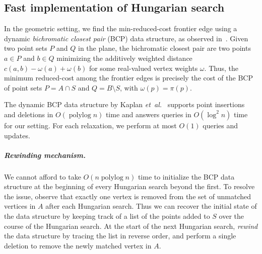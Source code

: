 \documentclass[a4paper,UKenglish]{socg-lipics-v2018}
\makeatletter
\def\etal{\emph{et~al.}}
\def\etal{\textit{et~al.}}
\def\polylog{\mathop{\mathrm{polylog}}}
\theoremstyle{plain}
\numberwithin{figure}{section}
\renewcommand{\paragraph}{\subparagraph}
\def\EMPH#1{\textcolor{BrickRed}{{\emph{#1}}}}
\def\n@te#1{\textsf{\boldmath \textbf{$\langle\!\langle$#1$\rangle\!\rangle$}}\leavevmode}
\def\note#1{\textcolor{red}{\n@te{#1}}}
\renewcommand{\note}[1]{} %
\makeatother
\begin{document}

\subsection{Fast implementation of Hungarian search}
\label{SS:fast-hungarian-matching}


In the geometric setting, we find the min-reduced-cost frontier edge using a dynamic
\EMPH{bichromatic closest pair} (BCP) data structure, as observed
in~\cite{AFPVX17,Vaidya89}.
Given two point sets $P$ and $Q$ in the plane, the bichromatic closest pair are two points
$a \in P$ and $b \in Q$ minimizing the additively weighted distance
$c(a, b) - \omega(a) + \omega(b)$ for some real-valued vertex weights $\omega$.
Thus, the minimum reduced-cost among the frontier edges is precisely the cost of the BCP of point sets
$P = A \cap S$ and $Q = B \setminus S$, with $\omega(p) = \pi(p)$.

The dynamic BCP data structure by Kaplan \etal~\cite{KMRSS17} supports point insertions and deletions in
$O(\polylog n)$ time and answers queries in $O(\log^2 n)$ time for our setting.
For each relaxation, we perform at most $O(1)$ queries and updates.

\paragraph{Rewinding mechanism.}
We cannot afford to take $O(n\polylog n)$ time to initialize the BCP data structure at the
beginning of every Hungarian search beyond the first.
To resolve the issue, observe that exactly one vertex is removed from the set of unmatched vertices in $A$ after each Hungarian search.
Thus we can recover the initial state of the data structure by keeping track of a list of the points added to $S$ over the course of the Hungarian search.
At the start of the next Hungarian search,
\emph{rewind} the data structure by tracing the list in reverse order, and perform a single deletion to remove the newly matched vertex in $A$.
\end{document}
